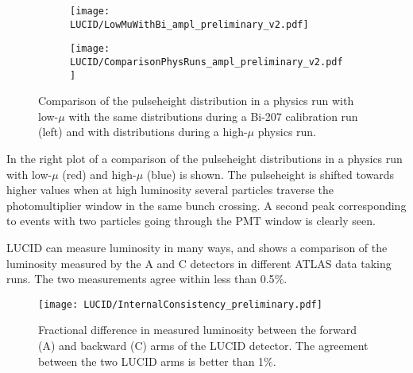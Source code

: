 \begin{figure}
\centering
\begin{subfigure}{.5\textwidth}
  \centering
  \texttt{[image: LUCID/LowMuWithBi\_ampl\_preliminary\_v2.pdf]}
  \label{fig:sub1}
\end{subfigure}%
\begin{subfigure}{.5\textwidth}
  \centering
  \texttt{[image: LUCID/ComparisonPhysRuns\_ampl\_preliminary\_v2.pdf]}
  \label{fig:sub2}
\end{subfigure}
\caption{Comparison of the pulseheight distribution in a physics run with low-$\mu$ with the same distributions 
during a Bi-207 calibration run (left) and with distributions during a high-$\mu$ physics run.}
\label{fig:Pulseheight}
\end{figure}

In the right plot of  a comparison of the pulseheight distributions in a physics run 
with low-$\mu$ (red) and high-$\mu$ (blue) is shown. The pulseheight is shifted towards higher values when at high 
luminosity several particles traverse the photomultiplier window in the same bunch crossing.
A second peak corresponding to events with two particles going through the PMT window is clearly seen.

LUCID can measure luminosity in many ways, and  shows a comparison of the 
luminosity measured by the A and C detectors in different ATLAS data taking runs. The two measurements agree within less than 0.5$\%$.

\begin{figure}
\centering
\texttt{[image: LUCID/InternalConsistency\_preliminary.pdf]}
\caption{Fractional difference in measured luminosity between the forward (A) and backward (C) arms of the LUCID 
detector. The agreement between the two LUCID arms is better than 1$\%$.}
\label{fig:InternalConsistency}
\end{figure}

